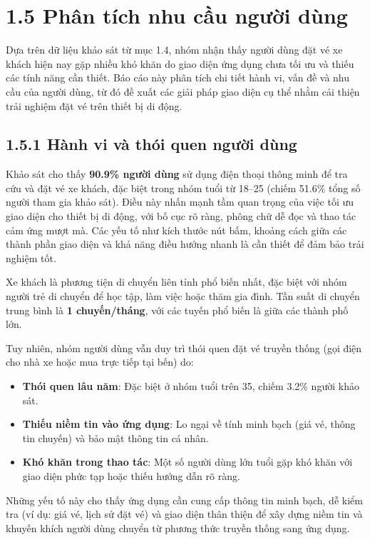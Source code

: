 
\section*{1.5 Phân tích nhu cầu người dùng}
Dựa trên dữ liệu khảo sát từ mục 1.4, nhóm nhận thấy người dùng đặt vé xe khách hiện nay gặp nhiều khó khăn do giao diện ứng dụng chưa tối ưu và thiếu các tính năng cần thiết. Báo cáo này phân tích chi tiết hành vi, vấn đề và nhu cầu của người dùng, từ đó đề xuất các giải pháp giao diện cụ thể nhằm cải thiện trải nghiệm đặt vé trên thiết bị di động.

\subsection*{1.5.1 Hành vi và thói quen người dùng}
Khảo sát cho thấy \textbf{90.9\% người dùng} sử dụng điện thoại thông minh để tra cứu và đặt vé xe khách, đặc biệt trong nhóm tuổi từ 18--25 (chiếm 51.6\% tổng số người tham gia khảo sát). Điều này nhấn mạnh tầm quan trọng của việc tối ưu giao diện cho thiết bị di động, với bố cục rõ ràng, phông chữ dễ đọc và thao tác cảm ứng mượt mà. Các yếu tố như kích thước nút bấm, khoảng cách giữa các thành phần giao diện và khả năng điều hướng nhanh là cần thiết để đảm bảo trải nghiệm tốt.

Xe khách là phương tiện di chuyển liên tỉnh phổ biến nhất, đặc biệt với nhóm người trẻ di chuyển để học tập, làm việc hoặc thăm gia đình. Tần suất di chuyển trung bình là \textbf{1 chuyến/tháng}, với các tuyến phổ biến là giữa các thành phố lớn.

Tuy nhiên, nhóm người dùng vẫn duy trì thói quen đặt vé truyền thống (gọi điện cho nhà xe hoặc mua trực tiếp tại bến) do:
\begin{itemize}
    \item \textbf{Thói quen lâu năm}: Đặc biệt ở nhóm tuổi trên 35, chiếm 3.2\% người khảo sát.
    \item \textbf{Thiếu niềm tin vào ứng dụng}: Lo ngại về tính minh bạch (giá vé, thông tin chuyến) và bảo mật thông tin cá nhân.
    \item \textbf{Khó khăn trong thao tác}: Một số người dùng lớn tuổi gặp khó khăn với giao diện phức tạp hoặc thiếu hướng dẫn rõ ràng.
\end{itemize}
Những yếu tố này cho thấy ứng dụng cần cung cấp thông tin minh bạch, dễ kiểm tra (ví dụ: giá vé, lịch sử đặt vé) và giao diện thân thiện để xây dựng niềm tin và khuyến khích người dùng chuyển từ phương thức truyền thống sang ứng dụng.

